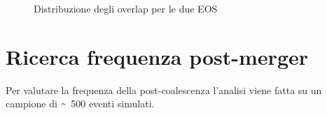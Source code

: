 \begin{figure}[H]
	\vspace{-15pt}
	\centering
	 \hspace{0.5pt}
	\vspace{-5pt}
	\caption{Distribuzione degli overlap per le due EOS}
	\label{fig:Overlap_distribution}
	\vspace{-15pt}
\end{figure}

\section{Ricerca frequenza post-merger}

Per valutare la frequenza della post-coalescenza l'analisi viene fatta su un campione di $\smallsim$ 500 eventi simulati. 

